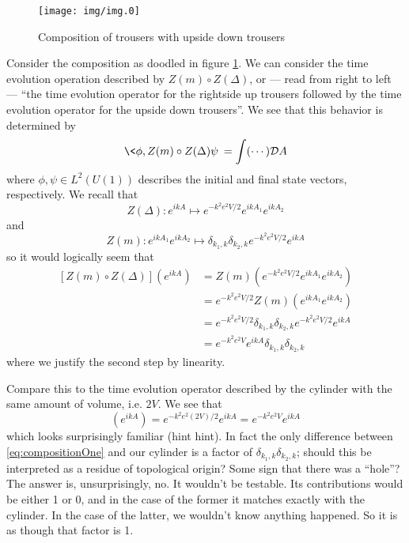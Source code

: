 
\begin{figure}[ht]
\texttt{[image: img/img.0]}
\caption{Composition of trousers with upside down trousers}\label{fig:img0}
\end{figure}

Consider the composition as doodled in figure \ref{fig:img0}. We
can consider the time evolution operation described by
$Z(m)\circ{Z(\Delta)}$, or --- read from right to left --- ``the
time evolution operator for the rightside up trousers followed by
the time evolution operator for the upside down trousers''. We
see that this behavior is determined by
\begin{equation}%
\<\phi,Z(m)\circ{Z(\Delta)}\psi\> = \int (\cdots) \mathcal{D}A
\end{equation}
where $\phi,\psi\in L^{2}(U(1))$ describes the initial and final
state vectors, respectively. We recall that
\begin{equation}%
Z(\Delta):e^{ikA}\mapsto e^{-k^{2}e^{2}V/2}e^{ikA_{1}}e^{ikA_{2}}
\end{equation}
and
\begin{equation}%
Z(m):e^{ikA_{1}}e^{ikA_{2}}\mapsto \delta_{k_{1},k}\delta_{k_{2},k}e^{-k^{2}e^{2}V/2}e^{ikA}
\end{equation}
so it would logically seem that
\begin{subequations}
\begin{align}
[Z(m)\circ Z(\Delta)](e^{ikA}) &= Z(m)\left(e^{-k^{2}e^{2}V/2}e^{ikA_{1}}e^{ikA_{2}}\right)\\
&= e^{-k^{2}e^{2}V/2}Z(m)\left(e^{ikA_{1}}e^{ikA_{2}}\right)\\
&= e^{-k^{2}e^{2}V/2}\delta_{k_{1},k}\delta_{k_{2},k}e^{-k^{2}e^{2}V/2}e^{ikA}\\
&= e^{-k^{2}e^{2}V}e^{ikA}\delta_{k_{1},k}\delta_{k_{2},k} \label{eq:compositionOne}
\end{align}
\end{subequations}
where we justify the second step by linearity.

Compare this to the time evolution operator described by the
cylinder with the same amount of volume, i.e. $2V$. We see that
\begin{equation}%
[Z(C)]\left(e^{ikA}\right) = e^{-k^{2}e^{2}(2V)/2}e^{ikA} = e^{-k^{2}e^{2}V}e^{ikA}
\end{equation}
which looks surprisingly familiar (hint hint). In fact the only
difference between \eqref{eq:compositionOne} and our cylinder is
a factor of $\delta_{k_{1},k}\delta_{k_{2},k}$; should this be
interpreted as a residue of topological origin? Some sign that
there was a ``hole''? The answer is, unsurprisingly, no. It
wouldn't be testable. Its contributions would be either 1 or 0,
and in the case of the former it matches exactly with the
cylinder. In the case of the latter, we wouldn't know anything
happened. So it is as though that factor is 1. 

